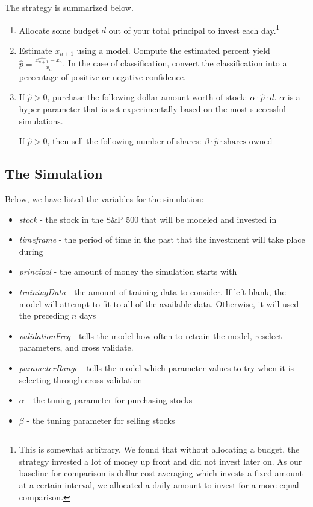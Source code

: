 \documentclass[12pt]{article}
\begin{document}
The strategy is summarized below.

\begin{enumerate}
	\item Allocate some budget $d$ out of your total principal to invest each day.\footnote{This is somewhat arbitrary. We found that without allocating a budget, the strategy invested a lot of money up front and did not invest later on. As our baseline for comparison is dollar cost averaging which invests a fixed amount at a certain interval, we allocated a daily amount to invest for a more equal comparison.}
	\item Estimate $x_{n+1}$ using a model. Compute the estimated percent yield $\hat{p} = \frac{\hat{x_{n+1}}-x_n}{x_n}$. In the case of classification, convert the classification into a percentage of positive or negative confidence.
	\item If $\hat{p} > 0$, purchase the following dollar amount worth of stock: $\alpha \cdot \hat{p} \cdot d$. $\alpha$ is a hyper-parameter that is set experimentally based on the most successful simulations.
	
	If $\hat{p}> 0$, then sell the following number of shares: $\beta \cdot \hat{p} \cdot \text{shares owned}$
\end{enumerate}

\subsection{The Simulation}
Below, we have listed the variables for the simulation:
\begin{itemize}
	\item \textit{stock} - the stock in the S\&P 500 that will be modeled and invested in
	\item \textit{timeframe} - the period of time in the past that the investment will take place during
	\item \textit{principal} - the amount of money the simulation starts with
	\item \textit{trainingData} - the amount of training data to consider. If left blank, the model will attempt to fit to all of the available data. Otherwise, it will used the preceding $n$ days
	\item \textit{validationFreq } - tells the model how often to retrain the model, reselect parameters, and cross validate.
	\item \textit{parameterRange } - tells the model which parameter values to try when it is selecting through cross validation
	\item \textit{$\alpha$} - the tuning parameter for purchasing stocks
	\item \textit{$\beta$} - the tuning parameter for selling stocks
\end{itemize}
\end{document}

